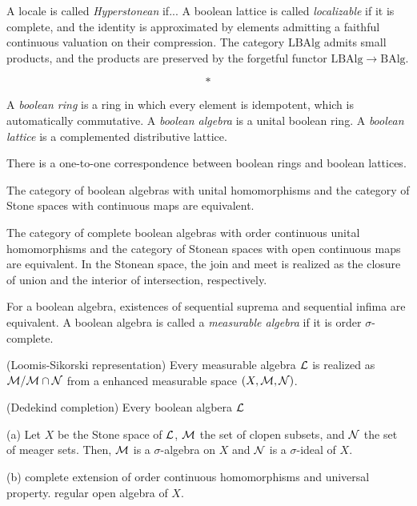 \documentclass{../../large}
\begin{document}
A locale is called \emph{Hyperstonean} if...
A boolean lattice is called \emph{localizable} if it is complete, and the identity is approximated by elements admitting a faithful continuous valuation on their compression.
The category $\mathrm{LBAlg}$ admits small products, and the products are preserved by the forgetful functor $\mathrm{LBAlg}\to\mathrm{BAlg}$.



\[*\]

\begin{prb}
A \emph{boolean ring} is a ring in which every element is idempotent, which is automatically commutative.
A \emph{boolean algebra} is a unital boolean ring.
A \emph{boolean lattice} is a complemented distributive lattice.
\begin{parts}
\item There is a one-to-one correspondence between boolean rings and boolean lattices.
\item The category of boolean algebras with unital homomorphisms and the category of Stone spaces with continuous maps are equivalent.
\item The category of complete boolean algebras with order continuous unital homomorphisms and the category of Stonean spaces with open continuous maps are equivalent.
In the Stonean space, the join and meet is realized as the closure of union and the interior of intersection, respectively.
\end{parts}
\end{prb}


\begin{prb}
For a boolean algebra, existences of sequential suprema and sequential infima are equivalent.
A boolean algebra is called a \emph{measurable algebra} if it is order $\sigma$-complete.
\begin{parts}
\item (Loomis-Sikorski representation) Every measurable algebra $\mathcal{L}$ is realized as $\mathcal{M}/\mathcal{M}\cap\mathcal{N}$ from a enhanced measurable space $(X,\mathcal{M},\mathcal{N})$.
\item (Dedekind completion) Every boolean algbera $\mathcal{L}$
\end{parts}
\end{prb}
\begin{pf}
(a)
Let $X$ be the Stone space of $\mathcal{L}$, $\mathcal{M}$ the set of clopen subsets, and $\mathcal{N}$ the set of meager sets.
Then, $\mathcal{M}$ is a $\sigma$-algebra on $X$ and $\mathcal{N}$ is a $\sigma$-ideal of $X$.

(b)
complete extension of order continuous homomorphisms and universal property.
regular open algebra of $X$.
\end{pf}
\end{document}
